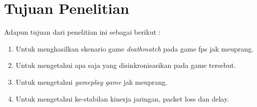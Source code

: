 \section{Tujuan Penelitian}
\noindent

Adapun tujuan dari penelitian ini sebagai berikut :
\begin{enumerate}
	\item Untuk menghasilkan skenario game \textit{deathmatch} pada game fps jak meuprang.
	\item Untuk mengetahui apa saja yang disinkronisasikan pada game tersebut.
	\item Untuk mengetahui \textit{gameplay game} jak meuprang.
	\item Untuk mengetahui ke-stabilan kinerja jaringan, packet loss dan delay. 
\end{enumerate}






